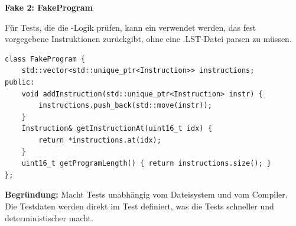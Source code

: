 \textbf{Fake 2: FakeProgram}

Für Tests, die die -Logik prüfen, kann ein  verwendet werden, das fest vorgegebene Instruktionen zurückgibt, ohne eine .LST-Datei parsen zu müssen.

\begin{lstlisting}[style=codeblock,language=picassocpp]
class FakeProgram {
    std::vector<std::unique_ptr<Instruction>> instructions;
public:
    void addInstruction(std::unique_ptr<Instruction> instr) {
        instructions.push_back(std::move(instr));
    }
    Instruction& getInstructionAt(uint16_t idx) {
        return *instructions.at(idx);
    }
    uint16_t getProgramLength() { return instructions.size(); }
};
\end{lstlisting}

\textbf{Begründung:} Macht Tests unabhängig vom Dateisystem und vom Compiler. Die Testdaten werden direkt im Test definiert, was die Tests schneller und deterministischer macht.

